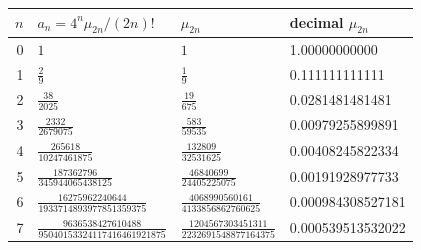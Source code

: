 \begin{tabular}{@{}rlll@{}}
\toprule
$n$ & $a_n=4^n\mu_{2n}/(2n)!$ & $\mu_{2n}$ & decimal $\mu_{2n}$ \\
\midrule
0 & $\displaystyle 1$ & $\displaystyle 1$ & 1.00000000000 \\
1 & $\displaystyle \frac{2}{9}$ & $\displaystyle \frac{1}{9}$ & 0.111111111111 \\
2 & $\displaystyle \frac{38}{2025}$ & $\displaystyle \frac{19}{675}$ & 0.0281481481481 \\
3 & $\displaystyle \frac{2332}{2679075}$ & $\displaystyle \frac{583}{59535}$ & 0.00979255899891 \\
4 & $\displaystyle \frac{265618}{10247461875}$ & $\displaystyle \frac{132809}{32531625}$ & 0.00408245822334 \\
5 & $\displaystyle \frac{187362796}{345944065438125}$ & $\displaystyle \frac{46840699}{24405225075}$ & 0.00191928977733 \\
6 & $\displaystyle \frac{16275962240644}{1933714893977851359375}$ & $\displaystyle \frac{4068990560161}{4133856862760625}$ & 0.000984308527181 \\
7 & $\displaystyle \frac{9636538427610488}{95040153324117416461921875}$ & $\displaystyle \frac{1204567303451311}{2232691548877164375}$ & 0.000539513532022 \\
\bottomrule
\end{tabular}
